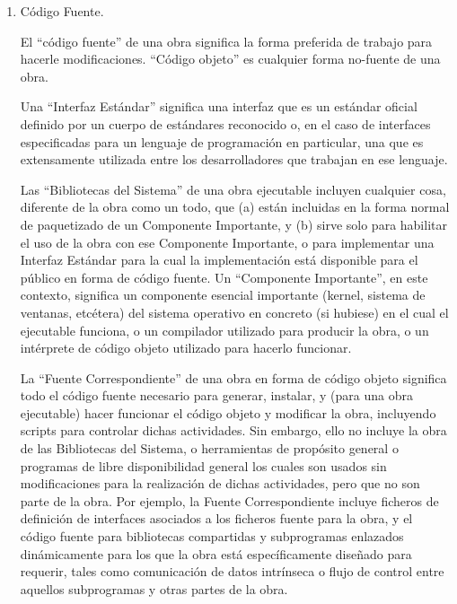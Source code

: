 {\begin{enumerate}
Una interfaz interactiva de usuario muestra ``Avisos Legales Apropiados''
en la medida que incluye una caracter\'{i}stica visible pr\'{a}ctica y 
destacable que (1) muestra un aviso apropiado de derechos de autor (``copyright''), e (2)
informa al usuario de que no hay garant\'{i}a para la obra (excepto las 
garant\'{i}as proporcionadas), que los licenciatarios pueden transmitir la 
obra bajo esta Licencia, y c\'{o}mo ver una copia de esta Licencia. 
Si la interfaz presenta una lista de comandos de usuario u opciones, 
como un men\'{u}, un elemento destacado en la lista satisface este criterio.

\item C\'{o}digo Fuente.

El ``c\'{o}digo fuente'' de una obra significa la forma preferida de
trabajo para hacerle modificaciones. ``C\'{o}digo objeto'' es cualquier 
forma no-fuente de una obra.

Una ``Interfaz Est\'{a}ndar'' significa una interfaz que es un est\'{a}ndar 
oficial definido por un cuerpo de est\'{a}ndares reconocido o, en el 
caso de interfaces especificadas para un lenguaje de programaci\'{o}n en
particular, una que es extensamente utilizada entre los
desarrolladores que trabajan en ese lenguaje.

Las ``Bibliotecas del Sistema'' de una obra ejecutable incluyen
cualquier cosa, diferente de la obra como un todo, que (a) est\'{a}n incluidas en la forma normal de paquetizado de un Componente Importante, y (b) sirve solo para habilitar el uso de la obra con ese Componente Importante, o para implementar una Interfaz Est\'{a}ndar
para la cual la implementaci\'{o}n est\'{a} disponible para el p\'{u}blico en
forma de c\'{o}digo fuente. Un ``Componente Importante'', en este
contexto, significa un componente esencial importante (kernel,
sistema de ventanas, etc\'{e}tera) del sistema operativo en concreto (si hubiese) en el cual el ejecutable funciona, o un compilador
utilizado para producir la obra, o un int\'{e}rprete de c\'{o}digo objeto
utilizado para hacerlo funcionar.

La ``Fuente Correspondiente'' de una obra en forma de c\'{o}digo
objeto significa todo el c\'{o}digo fuente necesario para generar,
instalar, y (para una obra ejecutable) hacer funcionar el c\'{o}digo
objeto y modificar la obra, incluyendo scripts para controlar
dichas actividades. Sin embargo, ello no incluye la obra de las Bibliotecas del Sistema, o herramientas de prop\'{o}sito general o
programas de libre disponibilidad general los cuales son usados sin
modificaciones para la realizaci\'{o}n de dichas actividades, pero que no son parte de la obra. Por ejemplo, la Fuente Correspondiente incluye ficheros de definici\'{o}n de interfaces asociados a los ficheros fuente para la obra, y el c\'{o}digo fuente para bibliotecas compartidas y subprogramas enlazados din\'{a}micamente para los que la obra est\'{a} espec\'{i}ficamente dise\~nado para requerir, tales como comunicaci\'{o}n de datos intr\'{i}nseca o flujo de control entre aquellos subprogramas y otras partes de la obra.


\end{enumerate}}

